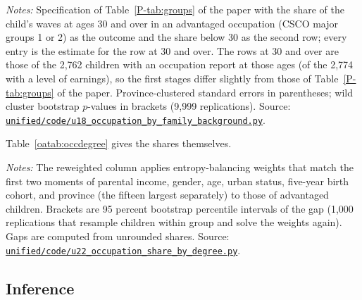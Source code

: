 \documentclass[11pt]{article}
\numberwithin{equation}{section}
\newcommand{\repourl}{https://github.com/JiachenJin1001/before-the-labor-market-or-inside-it}
\newcommand{\code}[1]{\href{\repourl/blob/main/#1}{\nolinkurl{#1}}}
\begin{document}
\begin{table}[H]
\centering
\small
\caption{The effect of college on the share of waves in an advantaged occupation, by family background.}
\label{oatab:occgroup}
\setlength{\tabcolsep}{4pt}

\par\smallskip
\begin{minipage}{0.94\textwidth}
\footnotesize\emph{Notes:} Specification of Table~\ref{P-tab:groups} of the paper with the share of the child's waves at ages 30 and over in an advantaged occupation (CSCO major groups 1 or 2) as the outcome and the share below 30 as the second row; every entry is the estimate for the row at 30 and over. The rows at 30 and over are those of the 2,762 children with an occupation report at those ages (of the 2,774 with a level of earnings), so the first stages differ slightly from those of Table~\ref{P-tab:groups} of the paper. Province-clustered standard errors in parentheses; wild cluster bootstrap $p$-values in brackets (9,999 replications). Source: \code{unified/code/u18_occupation_by_family_background.py}.
\end{minipage}
\end{table}

Table~\ref{oatab:occdegree} gives the shares themselves. 

\begin{table}[H]
\centering
\small
\caption{Share of waves at ages 30 and over in an advantaged occupation, by family background and degree.}
\label{oatab:occdegree}
\setlength{\tabcolsep}{4pt}

\par\smallskip
\begin{minipage}{0.94\textwidth}
\footnotesize\emph{Notes:}  The reweighted column applies entropy-balancing weights that match the first two moments of parental income, gender, age, urban status, five-year birth cohort, and province (the fifteen largest separately) to those of advantaged children. Brackets are 95 percent bootstrap percentile intervals of the gap (1,000 replications that resample children within group and solve the weights again). Gaps are computed from unrounded shares. Source: \code{unified/code/u22_occupation_share_by_degree.py}.
\end{minipage}
\end{table}

\subsection{Inference}
\end{document}
